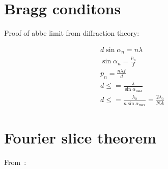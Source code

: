 \section{Bragg conditons}

Proof of abbe limit from diffraction theory:

\begin{align}
    d \sin \alpha_n = n \lambda \\
    \sin\alpha_n = \frac{p_n}{f} \\
    p_n = \frac{n\lambda f}{d} \\
    d \le = \frac{\lambda}{\sin\alpha_{\text{max}}} \\
    d \le = \frac{\lambda_0}{n\sin\alpha_{\text{max}}} = \frac{2\lambda_0}{NA}
\end{align}


\section{Fourier slice theorem}\label{appendix:fourierslice}
From~\cite{kakPrinciplesComputerizedTomographic2001}:

